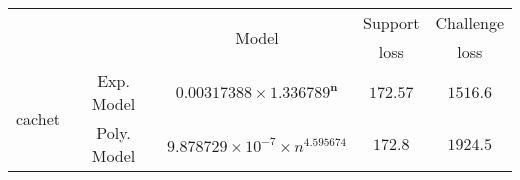 \begin{tabular}{ccccc} 
\hline 
 &  & \multirow{2}{*}{Model} & Support & Challenge\tabularnewline 
 &  &  & loss  & loss\tabularnewline 
\hline 
\hline 
\multirow{2}{*}{cachet} & Exp. Model & $\mathbf{0.00317388\times 1.336789^{n}}$ & $\mathbf{172.57}$ & $\mathbf{1516.6}$ \tabularnewline 
 & Poly. Model & $9.878729\times10^{-7}\times n^{4.595674}$ & $172.8$ & $1924.5$ \tabularnewline 
\hline 
\end{tabular} 

